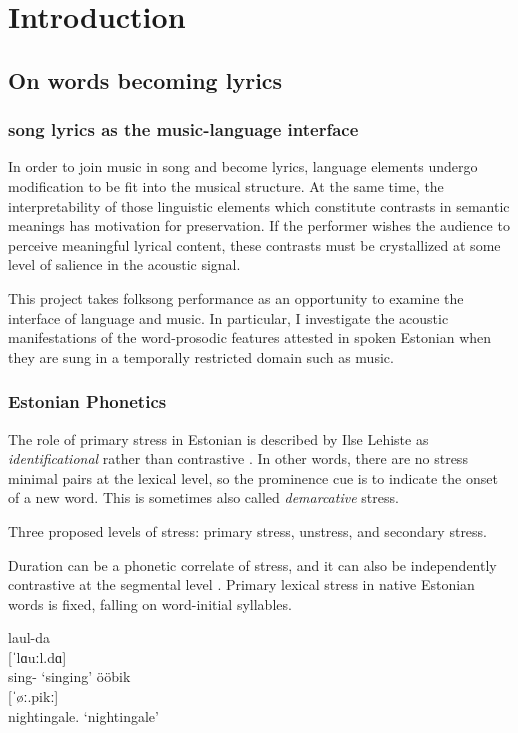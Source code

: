 \chapter{Introduction}

\section{On words becoming lyrics}

\subsection{song lyrics as the music-language interface}

In order to join music in song and become lyrics, language elements undergo modification to be fit into the musical structure. At the same time, the interpretability of those linguistic elements which constitute contrasts in semantic meanings has motivation for preservation. If the performer wishes the audience to perceive meaningful lyrical content, these contrasts must be crystallized at some level of salience in the acoustic signal. 

This project takes folksong performance as an opportunity to examine the interface of language and music. In particular, I investigate the acoustic manifestations of the word-prosodic features attested in spoken Estonian when they are sung in a temporally restricted domain such as music. 




\subsection{Estonian Phonetics}
The role of primary stress in Estonian is described by Ilse Lehiste as {\it identificational} rather than contrastive \citep{lehistePhoneticsMetrics1992}. In other words, there are no stress minimal pairs at the lexical level, so the prominence cue is to indicate the onset of a new word. This is sometimes also called {\it demarcative} stress.



Three proposed levels of stress: primary stress, unstress, and secondary stress. \citep{lippusAcousticStudyEstonian2014a}

Duration can be a phonetic correlate of stress, and it can also be independently contrastive at the segmental level \citep{lehistePhoneticsMetrics1992}. 
Primary lexical stress in native Estonian words is fixed, falling on word-initial syllables. 
\cite{eekmeisterUralica98}
\begin{exe}
\ex \gll laul-da \\
	{[ˈlɑuːl.dɑ]} \\
	sing-\Tr{} 
	\glt	`singing'
\ex 	ööbik \\
	{[ˈøː.pikː]} \\
	nightingale.\Nom{} 
	\glt`nightingale'
\end{exe}

